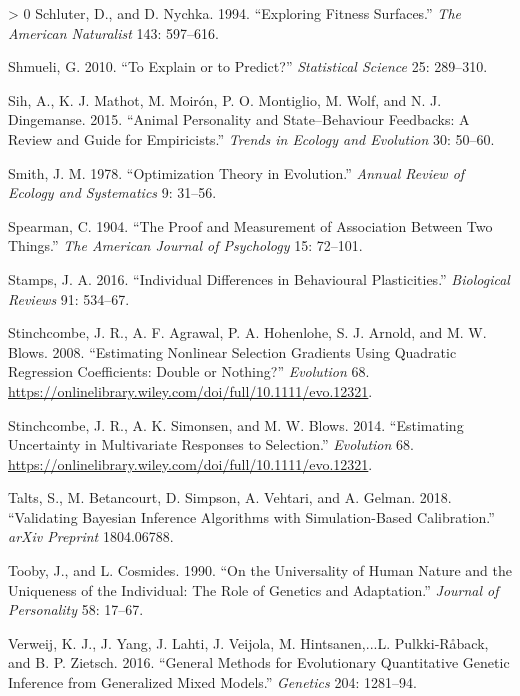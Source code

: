 \documentclass{article}
\newlength{\cslhangindent}
\newenvironment{CSLReferences}[3] %
 {%
  \setlength{\parindent}{0pt}
  \ifodd #1 \everypar{\setlength{\hangindent}{\cslhangindent}}\ignorespaces\fi
  \ifnum #2 > 0
  \setlength{\parskip}{#2\baselineskip}
  \fi
 }%
 {}
\begin{document}
\begin{CSLReferences}{1}{0}
\leavevmode\hypertarget{ref-Schluter1994}{}%
Schluter, D., and D. Nychka. 1994. {``Exploring Fitness Surfaces.''}
\emph{The American Naturalist} 143: 597--616.

\leavevmode\hypertarget{ref-Shmueli2010}{}%
Shmueli, G. 2010. {``To Explain or to Predict?''} \emph{Statistical
Science} 25: 289--310.

\leavevmode\hypertarget{ref-Sih2015}{}%
Sih, A., K. J. Mathot, M. Moirón, P. O. Montiglio, M. Wolf, and N. J.
Dingemanse. 2015. {``Animal Personality and State--Behaviour Feedbacks:
A Review and Guide for Empiricists.''} \emph{Trends in Ecology and
Evolution} 30: 50--60.

\leavevmode\hypertarget{ref-Smith1978}{}%
Smith, J. M. 1978. {``Optimization Theory in Evolution.''} \emph{Annual
Review of Ecology and Systematics} 9: 31--56.

\leavevmode\hypertarget{ref-Spearman1904}{}%
Spearman, C. 1904. {``The Proof and Measurement of Association Between
Two Things.''} \emph{The American Journal of Psychology} 15: 72--101.

\leavevmode\hypertarget{ref-Stamps2016}{}%
Stamps, J. A. 2016. {``Individual Differences in Behavioural
Plasticities.''} \emph{Biological Reviews} 91: 534--67.

\leavevmode\hypertarget{ref-Stinch2008}{}%
Stinchcombe, J. R., A. F. Agrawal, P. A. Hohenlohe, S. J. Arnold, and M.
W. Blows. 2008. {``Estimating Nonlinear Selection Gradients Using
Quadratic Regression Coefficients: Double or Nothing?''}
\emph{Evolution} 68.
\url{https://onlinelibrary.wiley.com/doi/full/10.1111/evo.12321}.

\leavevmode\hypertarget{ref-Stinch2014}{}%
Stinchcombe, J. R., A. K. Simonsen, and M. W. Blows. 2014. {``Estimating
Uncertainty in Multivariate Responses to Selection.''} \emph{Evolution}
68. \url{https://onlinelibrary.wiley.com/doi/full/10.1111/evo.12321}.

\leavevmode\hypertarget{ref-Talts2018}{}%
Talts, S., M. Betancourt, D. Simpson, A. Vehtari, and A. Gelman. 2018.
{``Validating Bayesian Inference Algorithms with Simulation-Based
Calibration.''} \emph{arXiv Preprint} 1804.06788.

\leavevmode\hypertarget{ref-Tooby1990}{}%
Tooby, J., and L. Cosmides. 1990. {``On the Universality of Human Nature
and the Uniqueness of the Individual: The Role of Genetics and
Adaptation.''} \emph{Journal of Personality} 58: 17--67.

\leavevmode\hypertarget{ref-Verw2012}{}%
Verweij, K. J., J. Yang, J. Lahti, J. Veijola, M. Hintsanen,...L.
Pulkki‐Råback, and B. P. Zietsch. 2016. {``General Methods for
Evolutionary Quantitative Genetic Inference from Generalized Mixed
Models.''} \emph{Genetics} 204: 1281--94.


\end{CSLReferences}
\end{document}
